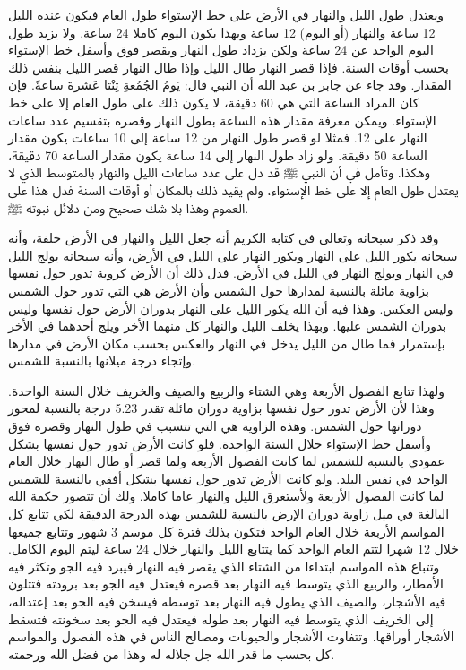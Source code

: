 ويعتدل طول الليل والنهار في الأرض على خط الإستواء طول العام فيكون عنده الليل 12 ساعة والنهار (أو اليوم) 12 ساعة وبهذا يكون اليوم كاملا 24 ساعة. ولا يزيد طول اليوم الواحد عن 24 ساعة ولكن يزداد طول النهار ويقصر فوق وأسفل خط الإستواء بحسب أوقات السنة. فإذا قصر النهار طال الليل وإذا طال النهار قصر الليل بنفس ذلك المقدار. وقد جاء عن جابر بن عبد الله أن النبي قال: يَومُ الجُمُعةِ ثِنْتا عَشرةَ ساعةً. فإن كان المراد الساعة التي هي 60 دقيقة، لا يكون ذلك على طول العام إلا على خط الإستواء. ويمكن معرفة مقدار هذه الساعة بطول النهار وقصره بتقسيم عدد ساعات النهار على 12. فمثلا لو قصر طول النهار من 12 ساعة إلى 10 ساعات يكون مقدار الساعة 50 دقيقة. ولو زاد طول النهار إلى 14 ساعة يكون مقدار الساعة 70 دقيقة، وهكذا. وتأمل في أن النبي ﷺ  قد دل على عدد ساعات الليل والنهار بالمتوسط الذي لا يعتدل طول العام إلا على خط الإستواء، ولم يقيد ذلك بالمكان أو أوقات السنة فدل هذا على العموم وهذا بلا شك صحيح ومن دلائل نبوته ﷺ.

وقد ذكر سبحانه وتعالى في كتابه الكريم أنه جعل الليل والنهار في الأرض خلفة، وأنه سبحانه يكور الليل على النهار ويكور النهار على الليل في الأرض، وأنه سبحانه يولج الليل في النهار ويولج النهار في الليل في الأرض. فدل ذلك أن الأرض كروية تدور حول نفسها بزاوية مائلة بالنسبة لمدارها حول الشمس وأن الأرض هي التي تدور حول الشمس وليس العكس. وهذا فيه أن الله يكور الليل على النهار بدوران الأرض حول نفسها وليس بدوران الشمس عليها. وبهذا يخلف الليل والنهار كل منهما الأخر ويلج أحدهما في الأخر بإستمرار فما طال من الليل يدخل في النهار والعكس بحسب مكان الأرض في مدارها وإتجاء درجة ميلانها بالنسبة للشمس.

ولهذا تتابع الفصول الأربعة وهي الشتاء والربيع والصيف والخريف خلال السنة الواحدة. وهذا لأن الأرض تدور حول نفسها بزاوية دوران مائلة تقدر 5.23 درجة بالنسبة لمحور دورانها حول الشمس. وهذه الزاوية هي التي تتسبب في طول النهار وقصره فوق وأسفل خط الإستواء خلال السنة الواحدة. فلو كانت الأرض تدور حول نفسها بشكل عمودي بالنسبة للشمس لما كانت الفصول الأربعة ولما قصر أو طال النهار خلال العام الواحد في نفس البلد. ولو كانت الأرض تدور حول نفسها بشكل أفقي بالنسبة للشمس لما كانت الفصول الأربعة ولأستغرق الليل والنهار عاما كاملا. ولك أن تتصور حكمة الله البالغة في ميل زاوية دوران الإرض بالنسبة للشمس بهذه الدرجة الدقيقة لكي تتابع كل المواسم الأربعة خلال العام الواحد فتكون بذلك فترة كل موسم 3 شهور وتتابع جميعها خلال 12 شهرا لتتم العام الواحد كما يتتابع الليل والنهار خلال 24 ساعة ليتم اليوم الكامل. وتتباع هذه المواسم ابتداءا من الشتاء الذي يقصر فيه النهار فيبرد فيه الجو وتكثر فيه الأمطار، والربيع الذي يتوسط فيه النهار بعد قصره فيعتدل فيه الجو بعد برودته فتتلون فيه الأشجار، والصيف الذي يطول فيه النهار بعد توسطه فيسخن فيه الجو بعد إعتداله، إلى الخريف الذي يتوسط فيه النهار بعد طوله فيعتدل فيه الجو بعد سخونته فتسقط الأشجار أوراقها. وتتفاوت الأشجار والحيونات ومصالح الناس في هذه الفصول والمواسم كل بحسب ما قدر الله جل جلاله له وهذا من فضل الله ورحمته.

